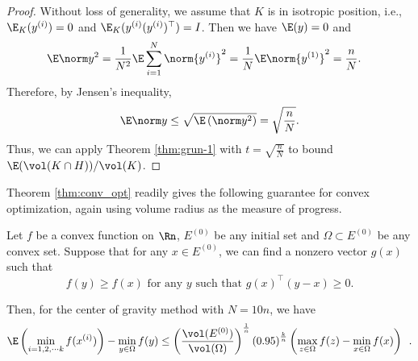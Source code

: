 \begin{proof}
Without loss of generality, we assume that $K$ is in isotropic position,
i.e., $\E_{K}(y^{(i)})=0$ and $\E_{K}(y^{(i)}(y^{(i)})^{\top})=I$.
Then we have $\E(y)=0$ and
\begin{align*}
\E\norm y^{2} & =\frac{1}{N^{2}}\E\sum_{i=1}^{N}\norm{y^{(i)}}^{2}=\frac{1}{N}\E\norm{y^{(1)}}^{2}=\frac{n}{N}.
\end{align*}
Therefore, by Jensen's inequality,
\[
\E\norm y\le\sqrt{\E\left(\norm y^{2}\right)}=\sqrt{\frac{n}{N}}.
\]
Thus, we can apply Theorem \ref{thm:grun-1} with $t=\sqrt{\frac{n}{N}}$
to bound $\E(\vol(K\cap H))/\vol(K)$. 
\end{proof}
Theorem \ref{thm:conv_opt} readily gives the following guarantee
for convex optimization, again using volume radius as the measure
of progress.
\begin{thm}
Let $f$ be a convex function on $\Rn$, $E^{(0)}$ be any initial
set and $\Omega\subset E^{(0)}$ be any convex set. Suppose that for
any $x\in E^{(0)}$, we can find a nonzero vector $g(x)$ such that
\[
f(y)\geq f(x)\text{ for any }y\text{ such that }g(x)^{\top}(y-x)\geq0.
\]

Then, for the center of gravity method with $N=10n$, we have
\[
\E\left(\min_{i=1,2,\cdots k}f(x^{(i)})\right)-\min_{y\in\Omega}f(y)\leq\left(\frac{\vol(E^{(0)})}{\vol(\Omega)}\right)^{\frac{1}{n}}\left(0.95\right)^{\frac{k}{n}}\left(\max_{z\in\Omega}f(z)-\min_{x\in\Omega}f(x)\right)\enspace.
\]
\end{thm}

